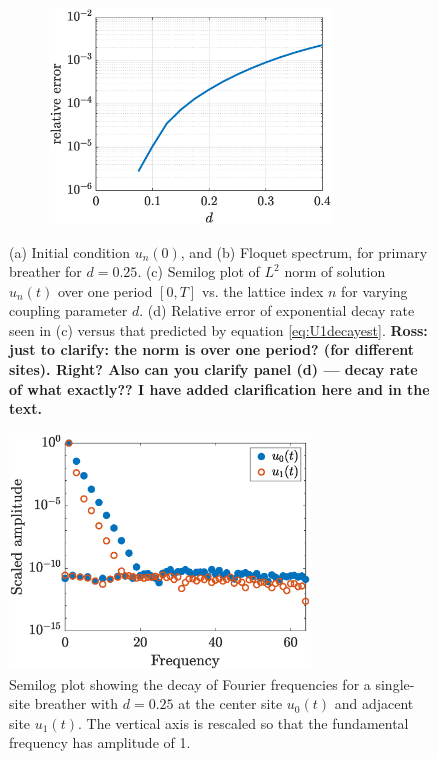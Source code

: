 \documentclass[12pt,reqno]{amsart}
\theoremstyle{definition}
\begin{document}
\begin{figure}
\begin{center}
\begin{subfigure}{0.45\linewidth}
		\caption{}
		\includegraphics[width=7.5cm]{singledecayerror.eps}
		\label{fig:singled}
	\end{subfigure}
	\end{center}
	\caption{(a) Initial condition $u_n(0)$, and (b) Floquet spectrum, for primary breather for $d = 0.25$. (c) Semilog plot of $L^2$ norm of solution $u_n(t)$ over one period $[0,T]$ vs. the lattice index $n$ for varying coupling parameter $d$. (d) Relative error of exponential decay rate seen in (c) versus that predicted by equation \cref{eq:U1decayest}.
	{\bf Ross: just to clarify: the norm is over one period? (for 
	different sites). Right? Also can you clarify panel (d) ---
	decay rate of what exactly?? I have added clarification here and in the text.} }
	\label{fig:single}
\end{figure}

\begin{figure}
	\begin{center}
	\includegraphics[width=8cm]{freqdecay.eps} 
	\end{center}
	\caption{Semilog plot showing the decay of Fourier frequencies for a single-site breather with $d=0.25$ at the center site $u_0(t)$ and adjacent site $u_1(t)$. The vertical axis is rescaled so that the fundamental frequency has amplitude of 1.}
	\label{fig:freqdecay}
\end{figure}
\end{document}
